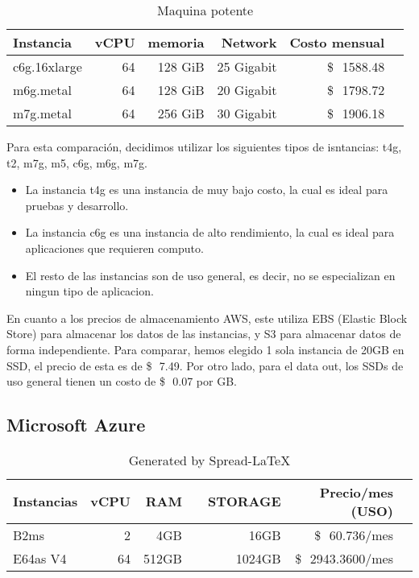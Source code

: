 \documentclass{article}
\newcommand{\usd}[1]{\SI{#1}[\$\ensuremath{\,}]{}}
\begin{document}
\begin{table}[!htp]\centering
\caption{Maquina potente}\label{tab:MV_Potente_AWS}
\scriptsize
\begin{tabular}{lrrrrr}\toprule
Instancia &vCPU &memoria &Network &Costo mensual\\\midrule
  c6g.16xlarge &64 &128 GiB &25 Gigabit & \usd{1588.48} \\
  m6g.metal &64 &128 GiB &20 Gigabit &\usd{1798.72} \\
  m7g.metal &64 &256 GiB &30 Gigabit &\usd{1906.18} \\
\bottomrule
\end{tabular}
\end{table}

Para esta comparación, decidimos utilizar los siguientes tipos de isntancias: t4g, t2, m7g, m5, c6g, m6g, m7g.
\begin{itemize}
  \item La instancia t4g es una instancia de muy bajo costo, la cual es ideal para pruebas y desarrollo.
  \item La instancia c6g es una instancia de alto rendimiento, la cual es ideal para aplicaciones que requieren computo.
  \item El resto de las instancias son de uso general, es decir, no se especializan en ningun tipo de aplicacion.
\end{itemize} 
\newpage

En cuanto a los precios de almacenamiento AWS, este utiliza EBS (Elastic Block Store) para almacenar los datos de las instancias, y S3 para almacenar datos de forma independiente.
Para comparar, hemos elegido 1 sola instancia de 20GB en SSD, el precio de esta es de \usd{7.49}.
Por otro lado, para el data out, los SSDs de uso general tienen un costo de \usd{0.07} por GB.

  \subsection{Microsoft Azure}

  \begin{table}[!htp]\centering
\caption{Generated by Spread-LaTeX}\label{tab:MV_Azure}
\scriptsize
\begin{tabular}{lrrrrrr}\toprule
\cellcolor[HTML]{A8A8A8}Instancias &\cellcolor[HTML]{A8A8A8}vCPU &\cellcolor[HTML]{A8A8A8}RAM &\cellcolor[HTML]{A8A8A8} &\cellcolor[HTML]{A8A8A8}STORAGE &\cellcolor[HTML]{A8A8A8}Precio/mes (USO) \\\midrule
  \cellcolor[HTML]{A8A8A8}B2ms &2 &4GB & &16GB &\usd{60.736}/mes \\
  \cellcolor[HTML]{A8A8A8}E64as V4 &64 &512GB & &1024GB &\usd{2943.3600}/mes \\
\bottomrule
\end{tabular}
\end{table}
\end{document}
